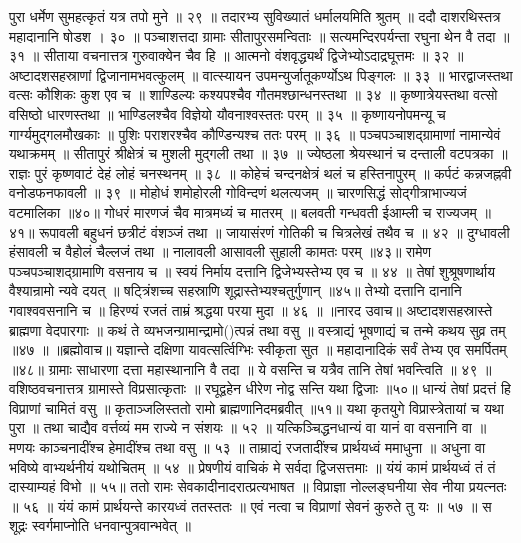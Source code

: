 पुरा धर्मेण सुमहत्कृतं यत्र तपो मुने ॥ २९ ॥
तदारभ्य सुविख्यातं धर्मालयमिति
श्रुतम् ॥ ददौ दाशरथिस्तत्र महादानानि षोडश । ३० ॥
पञ्चाशत्तदा ग्रामाः सीतापुरसमन्विताः ॥
सत्यमन्दिरपर्यन्ता रघुना थेन वै तदा ॥ ३१ ॥
सीताया वचनात्तत्र गुरुवाक्येन चैव हि ॥
आत्मनो वंशवृद्ध्यर्थं द्विजेभ्योऽदाद्रघूत्तमः ॥ ३२ ॥
अष्टादशसहस्राणां द्विजानामभवत्कुलम् ॥
वात्स्यायन उपमन्युर्जातूकर्ण्योऽथ पिङ्गलः ॥ ३३ ॥
भारद्वाजस्तथा वत्सः कौशिकः कुश एव च ॥
शाण्डिल्यः कश्यपश्चैव गौतमश्छान्धनस्तथा ॥ ३४ ॥
कृष्णात्रेयस्तथा वत्सो वसिष्ठो धारणस्तथा ॥
भाण्डिलश्चैव विज्ञेयो यौवनाश्वस्ततः परम् ॥ ३५ ॥
कृष्णायनोपमन्यू च गार्ग्यमुद्गलमौखकाः ॥
पुशिः पराशरश्चैव कौण्डिन्यश्च ततः परम् ॥ ३६ ॥
पञ्चपञ्चाशद्ग्रामाणां नामान्येवं यथाक्रमम् ॥
सीतापुरं श्रीक्षेत्रं च मुशली मुद्गली तथा ॥ ३७ ॥
ज्येष्ठला श्रेयस्थानं च दन्ताली वटपत्रका ॥
राज्ञः पुरं कृष्णवाटं देहं लोहं चनस्थनम् ॥ ३८ ॥
कोहेचं चन्दनक्षेत्रं थलं च हस्तिनापुरम् ॥
कर्पटं कन्नजह्नवी वनोडफनफावली ॥ ३९ ॥
मोहोधं शमोहोरली गोविन्दणं थलत्यजम् ॥
चारणसिद्धं सोद्गीत्राभाज्यजं वटमालिका ॥४०॥
गोधरं मारणजं चैव मात्रमध्यं च मातरम् ॥
बलवती गन्धवती ईआम्ली च राज्यजम् ॥४१॥
रूपावली बहुधनं छत्रीटं वंशञ्जं तथा ॥
जायासंरणं गोतिकी च चित्रलेखं तथैव च ॥ ४२ ॥
दुग्धावली हंसावली च वैहोलं चैल्लजं तथा ॥
नालावली आसावली सुहाली कामतः परम् ॥४३॥
रामेण पञ्चपञ्चाशद्ग्रामाणि वसनाय च ॥
स्वयं निर्माय दत्तानि द्विजेभ्यस्तेभ्य एव च ॥ ४४ ॥
तेषां शुश्रूषणार्थाय वैश्यान्रामो न्यवे दयत् ॥
षट्त्रिंशच्च सहस्राणि शूद्रास्तेभ्यश्चतुर्गुणान् ॥४५॥
तेभ्यो दत्तानि दानानि गवाश्ववसनानि च ॥
हिरण्यं रजतं ताम्रं श्रद्धया परया मुदा ॥ ४६ ॥
॥नारद उवाच॥
अष्टादशसहस्रास्ते ब्राह्मणा वेदपारगाः ॥
कथं ते व्यभजन्ग्रामान्द्रामो()त्पन्नं तथा वसु ॥
वस्त्राद्यं भूषणाद्यं च तन्मे कथय सुव्र तम् ॥४७ ॥
॥ब्रह्मोवाच॥
यज्ञान्ते दक्षिणा यावत्सर्त्विग्भिः स्वीकृता सुत ॥
महादानादिकं सर्वं तेभ्य एव समर्पितम् ॥४८॥
ग्रामाः साधारणा दत्ता महास्थानानि वै तदा ॥
ये वसन्ति च यत्रैव तानि तेषां भवन्त्विति ॥ ४९ ॥
वशिष्ठवचनात्तत्र ग्रामास्ते विप्रसात्कृताः ॥
रघूद्वहेन धीरेण नोद्व सन्ति यथा द्विजाः ॥५०॥
धान्यं तेषां प्रदत्तं हि विप्राणां चामितं वसु ॥
कृताञ्जलिस्ततो रामो ब्राह्मणानिदमब्रवीत् ॥५१॥
यथा कृतयुगे विप्रास्त्रेतायां च यथा पुरा ॥
तथा चाद्यैव वर्त्तव्यं मम राज्ये न संशयः ॥ ५२ ॥
यत्किञ्चिद्धनधान्यं वा यानं वा वसनानि वा ॥
मणयः काञ्चनादींश्च हेमादींश्च तथा वसु ॥ ५३ ॥
ताम्राद्यं रजतादींश्च प्रार्थयध्वं ममाधुना ॥
अधुना वा भविष्ये वाभ्यर्थनीयं यथोचितम् ॥ ५४ ॥
प्रेषणीयं वाचिकं मे सर्वदा द्विजसत्तमाः ॥
यंयं कामं प्रार्थयध्वं तं तं दास्याम्यहं विभो ॥ ५५॥
ततो रामः सेवकादीनादरात्प्रत्यभाषत ॥
विप्राज्ञा नोल्लङ्घनीया सेव नीया प्रयत्नतः ॥ ५६ ॥
यंयं कामं प्रार्थयन्ते कारयध्वं ततस्ततः ॥
एवं नत्वा च विप्राणां सेवनं कुरुते तु यः ॥ ५७ ॥
स शूद्रः स्वर्गमाप्नोति धनवान्पुत्रवान्भवेत् ॥
